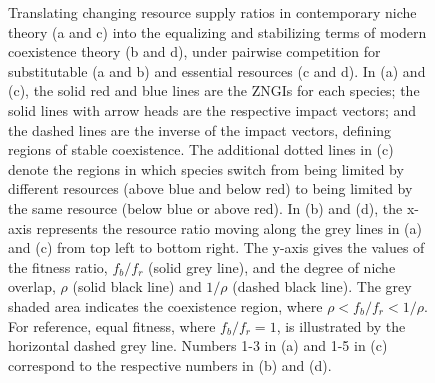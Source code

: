 \newpage
\begin{figure}[h!]
\centering
{}
\caption[Translating changing resource supply ratios in contemporary niche theory into the equalizing and stabilizing terms of modern coexistence theory, under pairwise competition for substitutable and essential resources.]
	{\hspace{1mm}Translating changing resource supply ratios in contemporary niche theory (a and c) into the equalizing and stabilizing terms of modern coexistence theory (b and d), under pairwise competition for substitutable (a and b) and essential resources (c and d). In (a) and (c), the solid red and blue lines are the ZNGIs for each species; the solid lines with arrow heads are the respective impact vectors; and the dashed lines are the inverse of the impact vectors, defining regions of stable coexistence. The additional dotted lines in (c) denote the regions in which species switch from being limited by different resources (above blue and below red) to being limited by the same resource (below blue or above red). In (b) and (d), the x-axis represents the resource ratio moving along the grey lines in (a) and (c) from top left to bottom right. The y-axis gives the values of the fitness ratio, $f_{b}/f_{r}$ (solid grey line), and the degree of niche overlap, $\rho$ (solid black line) and $1/\rho$ (dashed black line). The grey shaded area indicates the coexistence region, where $\rho<f_{b}/f_{r}<1/\rho$. For reference, equal fitness, where $f_{b}/f_{r}=1$, is illustrated by the horizontal dashed grey line. Numbers 1-3 in (a) and 1-5 in (c) correspond to the respective numbers in (b) and (d).}
\label{fig:supply-ms-fig}
\end{figure}



